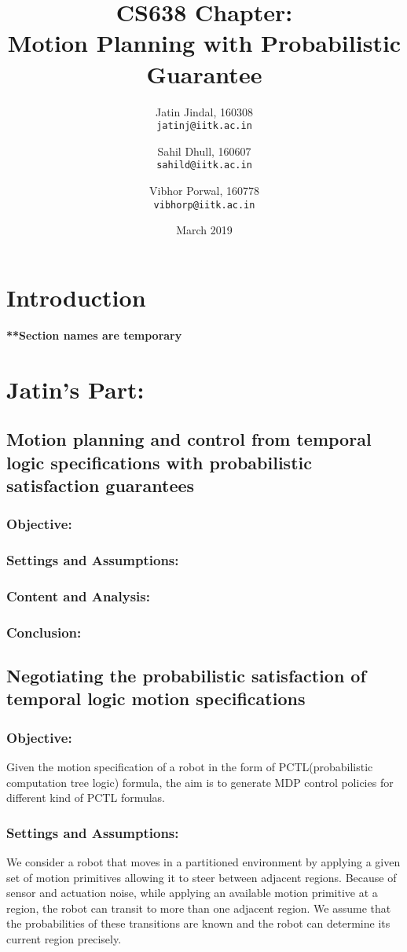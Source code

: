\documentclass{article}
\title{
    CS638 Chapter: \\
    Motion Planning with Probabilistic Guarantee
}
\author{
    Jatin Jindal, 160308\\
    \texttt{jatinj@iitk.ac.in}
    \and
    Sahil Dhull, 160607\\
    \texttt{sahild@iitk.ac.in}
    \and
    Vibhor Porwal, 160778\\
    \texttt{vibhorp@iitk.ac.in}
}
\date{March 2019}
\theoremstyle{definition}
\begin{document}
\maketitle

\section{Introduction}
\textbf{**Section names are temporary}

\section{Jatin's Part:}
\subsection{Motion planning and control from temporal logic specifications with probabilistic satisfaction guarantees}
\subsubsection{Objective:} 
\subsubsection{Settings and Assumptions:}

\subsubsection{Content and Analysis:}

\subsubsection{Conclusion:}

\subsection{Negotiating the probabilistic satisfaction of temporal logic motion specifications}
\subsubsection{Objective:} Given the motion specification of a robot in the form of PCTL(probabilistic computation tree logic) formula, the aim is to generate MDP control policies for different kind of PCTL formulas.


\subsubsection{Settings and Assumptions:} We consider a robot that moves in a partitioned environment by applying a given set of motion primitives allowing it to steer between
adjacent regions. Because of sensor and actuation noise, while applying an available motion primitive at a region, the robot can transit to more than one adjacent region. We assume that the probabilities of these transitions are known and the robot can determine its current region precisely.
\end{document}
